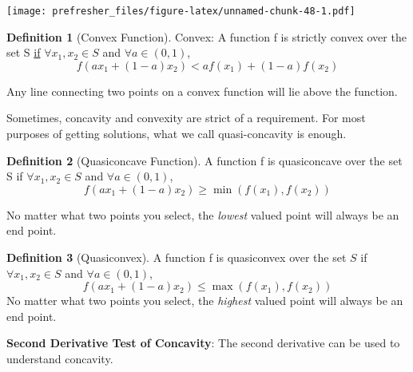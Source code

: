 \documentclass[
]{book}
\theoremstyle{definition}
\newtheorem{definition}{Definition}[chapter]
\theoremstyle{definition}
\theoremstyle{definition}
\theoremstyle{remark}
\begin{document}
\texttt{[image: prefresher\_files/figure-latex/unnamed-chunk-48-1.pdf]}

\begin{definition}[Convex Function]
\protect\hypertarget{def:unnamed-chunk-49}{}{\label{def:unnamed-chunk-49} {} }Convex: A function f is strictly convex over the set S \underline{if} \(\forall x_1,x_2 \in S\) and \(\forall a \in (0,1)\), \[f(ax_1 + (1-a)x_2) < af(x_1) + (1-a)f(x_2)\]

Any line connecting two points on a convex function will lie above the function.
\end{definition}

Sometimes, concavity and convexity are strict of a requirement. For most purposes of getting solutions, what we call quasi-concavity is enough.

\begin{definition}[Quasiconcave Function]
\protect\hypertarget{def:unnamed-chunk-50}{}{\label{def:unnamed-chunk-50} {} }A function f is quasiconcave over the set S if \(\forall x_1,x_2 \in S\) and \(\forall a \in (0,1)\), \[f(ax_1 + (1-a)x_2) \ge \min(f(x_1),f(x_2))\]

No matter what two points you select, the \textit{lowest} valued point will always be an end point.
\end{definition}

\begin{definition}[Quasiconvex]
\protect\hypertarget{def:unnamed-chunk-51}{}{\label{def:unnamed-chunk-51} {} }A function f is quasiconvex over the set \(S\) if \(\forall x_1,x_2 \in S\) and \(\forall a \in (0,1)\), \[f(ax_1 + (1-a)x_2) \le \max(f(x_1),f(x_2))\]
No matter what two points you select, the \textit{highest} valued point will always be an end point.
\end{definition}

\textbf{Second Derivative Test of Concavity}: The second derivative can be used to understand concavity.
\end{document}
